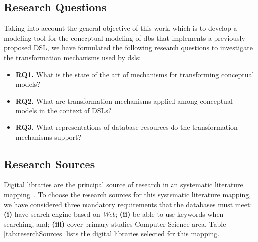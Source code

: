 \subsection{Research Questions} \label{ssec_slm:researchQuestions}

Taking into account the general objective of this work, which is to develop a modeling tool for the conceptual modeling of \acp{db} that implements a previously proposed DSL, we have formulated the following research questions to investigate the transformation mechanisms used by \acp{dsl}:

\begin{itemize}
    \item \textbf{RQ1.} What is the state of the art of mechanisms for transforming conceptual models?
    \item \textbf{RQ2.} What are transformation mechanisms applied among conceptual models in the context of DSLs?
    \item \textbf{RQ3.} What representations of database resources do the transformation mechanisms support?
\end{itemize}

\subsection{Research Sources} \label{ssec_slm:researchSources}

Digital libraries are the principal source of research in an systematic literature mapping~\cite{Petersen:2008}.
To choose the research sources for this systematic literature mapping, we have considered three mandatory requirements that the databases must meet:
\textbf{(i)} have search engine based on \textit{Web};
\textbf{(ii)} be able to use keywords when searching, and;
\textbf{(iii)} cover primary studies Computer Science area.
Table \ref{tab:reserchSources} lists the digital libraries selected for this mapping.
        
